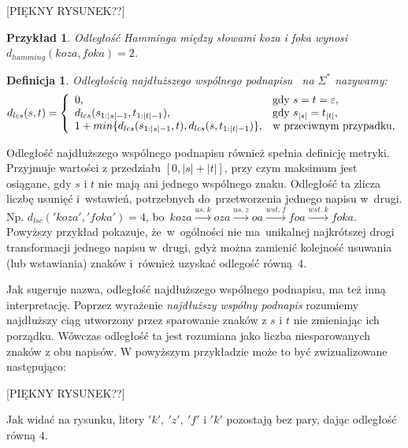 \documentclass[12pt, twoside, openany]{report}
\theoremstyle{plain}
\newtheorem{defi}{Definicja}[section]
\newtheorem{prz}{Przykład}[section]
\begin{document}
[PIĘKNY RYSUNEK??]

\begin{prz}
Odległość Hamminga między słowami \emph{koza} i \emph{foka} wynosi $d_{hamming}(koza, foka) = 2$.
\end{prz}

\begin{defi}
\emph{Odległością najdłuższego wspólnego podnapisu}~\cite{Needleman2008:generalmethod} na $\Sigma^*$ nazywamy:
$$
d_{lcs}(s, t) = \left\{
\begin{array}{l l}     
    0, & \text{gdy } s = t = \varepsilon,\\
    d_{lcs}(s_{1:|s|-1}, t_{1:|t|-1}), & \text{gdy } s_{|s|} = t_{|t|}, \\
    1+min\{d_{lcs}(s_{1:|s|-1}, t), d_{lcs}(s, t_{1:|t|-1})\}, & \text{w przeciwnym przypadku},
\end{array}\right.
$$
\end{defi}

Odległość najdłuższego wspólnego podnapisu również spełnia definicję metryki. Przyjmuje wartości z przedziału $[0, |s|+|t|]$, przy czym maksimum jest osiągane, gdy $s$ i $t$ nie mają ani jednego wspólnego znaku.
Odległość ta zlicza liczbę usunięć i~wstawień, potrzebnych do~przetworzenia jednego napisu w~drugi. Np. $d_{lsc}('koza', 'foka') = 4$, bo~$koza  \xrightarrow{us.\ k} oza \xrightarrow{us.\ z} oa  \xrightarrow{wst.\ f} foa \xrightarrow{wst.\ k} foka$.\\

Powyższy przykład pokazuje, że~w~ogólności nie ma~unikalnej najkrótszej drogi transformacji jednego napisu w~drugi, gdyż można zamienić kolejność usuwania (lub wstawiania) znaków i~również uzyskać odlegość równą~$4$.

Jak sugeruje nazwa, odległość najdłuższego wspólnego podnapisu, ma też inną interpretację. Poprzez wyrażenie \emph{najdłuższy wspólny podnapis} rozumiemy najdłuższy ciąg utworzony przez sparowanie znaków z $s$ i $t$ nie zmieniając ich porządku. Wówczas odległość ta jest rozumiana jako liczba niesparowanych znaków z obu napisów. W powyższym przykładzie może to być zwizualizowane następująco:
	
[PIĘKNY RYSUNEK??]

Jak widać na rysunku, litery $'k',\ 'z',\ 'f'$ i $'k'$ pozostają bez pary, dając odległość równą $4$.
\end{document}
